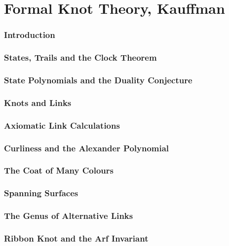 \part{Formal Knot Theory, Kauffman}

\section{Introduction}

\section{States, Trails and the Clock Theorem}

\section{State Polynomials and the Duality Conjecture}

\section{Knots and Links}

\section{Axiomatic Link Calculations}

\section{Curliness and the Alexander Polynomial}

\section{The Coat of Many Colours}

\section{Spanning Surfaces}

\section{The Genus of Alternative Links}

\section{Ribbon Knot and the Arf Invariant}

